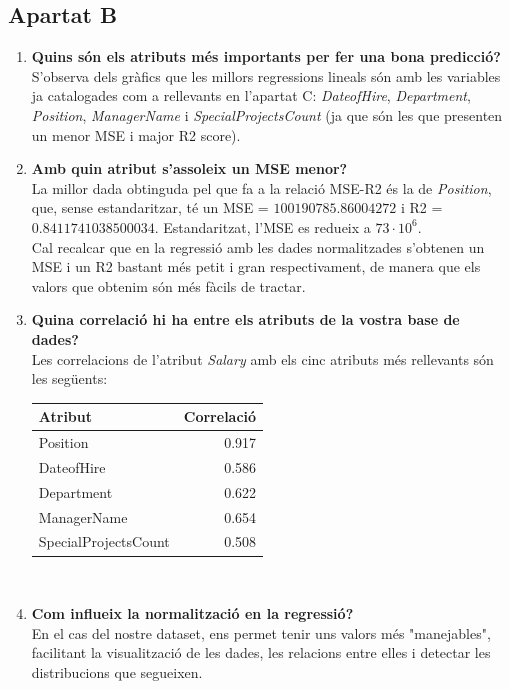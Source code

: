 \documentclass[a4paper, 11pt]{article}
\begin{document}
\subsection{Apartat B}
\begin{enumerate}
    \item \textbf{Quins són els atributs més importants per fer una bona predicció?}\\
    S'observa dels gràfics que les millors regressions lineals són amb les variables ja catalogades com a rellevants en l'apartat C: \textit{DateofHire}, \textit{Department}, \textit{Position}, \textit{ManagerName} i \textit{SpecialProjectsCount} (ja que són les que presenten un menor MSE i major R2 score).
    \item \textbf{Amb quin atribut s'assoleix un MSE menor?}\\
    La millor dada obtinguda pel que fa a la relació MSE-R2 és la de \textit{Position}, que, sense estandaritzar, té un MSE = $100190785.86004272$ i R2 = $0.8411741038500034$. Estandaritzat, l'MSE es redueix a $73\cdot 10^6$. 
    \\
    Cal recalcar que en la regressió amb les dades normalitzades s'obtenen un MSE i un R2 bastant més petit i gran respectivament, de manera que els valors que obtenim són més fàcils de tractar.

    \item \textbf{Quina correlació hi ha entre els atributs de la vostra base de dades?
}\\
    Les correlacions de l'atribut \textit{Salary} amb els cinc atributs més rellevants són les següents:

\begin{table}[h]
    \centering
    \begin{tabular}{l|r}
        \textbf{Atribut} & \textbf{Correlació}\\\hline\hline
        Position & 0.917  \\\hline
        DateofHire & 0.586  \\\hline
        Department & 0.622  \\\hline
        ManagerName & 0.654  \\\hline
        SpecialProjectsCount & 0.508 \\
    \end{tabular}
    \label{tab:my_label}
\end{table}\\


    
    \item \textbf{Com influeix la normalització en la regressió?}\\
    En el cas del nostre dataset, ens permet tenir uns valors més "manejables", facilitant la visualització de les dades, les relacions entre elles i detectar les distribucions que segueixen. 


\end{enumerate}
\end{document}
